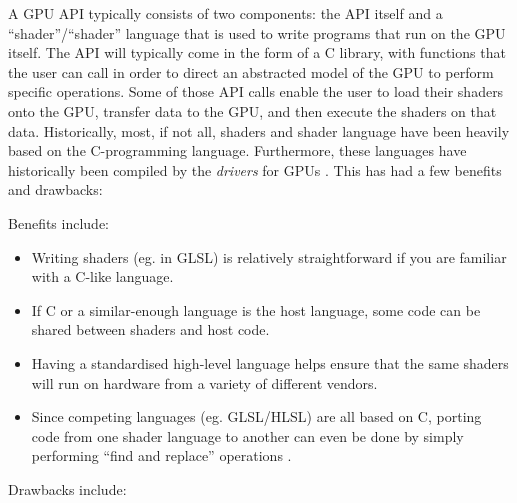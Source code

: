 \documentclass[a4paper,12pt,twoside,openright]{report}
\begin{document}
A GPU API typically consists of two components: the API itself and a
``shader''/``shader'' language that is used to write programs that run on the
GPU itself. The API will typically come in the form of a C library, with
functions that the user can call in order to direct an abstracted model of the
GPU to perform specific operations. Some of those API calls enable the user to
load their shaders onto the GPU, transfer data to the GPU, and then execute the
shaders on that data. Historically, most, if not all, shaders and shader
language have been heavily based on the C-programming language. Furthermore,
these languages have historically been compiled by the \textit{drivers} for
GPUs \cite{TODO}. This has had a few benefits and drawbacks:

Benefits include:

\begin{itemize}

    \item Writing shaders (eg. in GLSL) is relatively straightforward if you
    are familiar with a C-like language.

    \item If C or a similar-enough language is the host language, some code can
    be shared between shaders and host code.

    \item Having a standardised high-level language helps ensure that the same
    shaders will run on hardware from a variety of different vendors.

    \item Since competing languages (eg. GLSL/HLSL) are all based on C, porting
    code from one shader language to another can even be done by simply
    performing ``find and replace'' operations \cite{PS4PortCrew}.

\end{itemize}

Drawbacks include:
\end{document}
